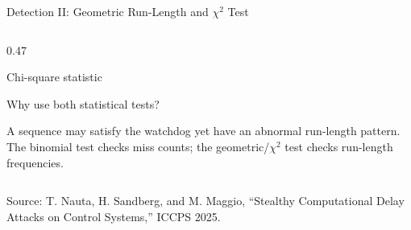 \documentclass[9pt,aspectratio=169]{beamer}
\newcommand{\paperref}{\tiny Source: T. Nauta, H. Sandberg, and M. Maggio, ``Stealthy Computational Delay Attacks on Control Systems,'' ICCPS 2025.}
\begin{document}
\begin{frame}{Detection II: Geometric Run-Length and $\chi^2$ Test}
\begin{columns}[T,onlytextwidth]
\begin{column}{0.47\textwidth}
\begin{block}{Chi-square statistic}
\end{block}

\begin{alertblock}{Why use both statistical tests?}

\scriptsize
A sequence may satisfy the watchdog yet have an abnormal
run-length pattern. The binomial test checks miss counts;
the geometric/$\chi^2$ test checks run-length frequencies.

\end{alertblock}

\end{column}
\end{columns}

\vfill
{\paperref}

\end{frame}
\end{document}
